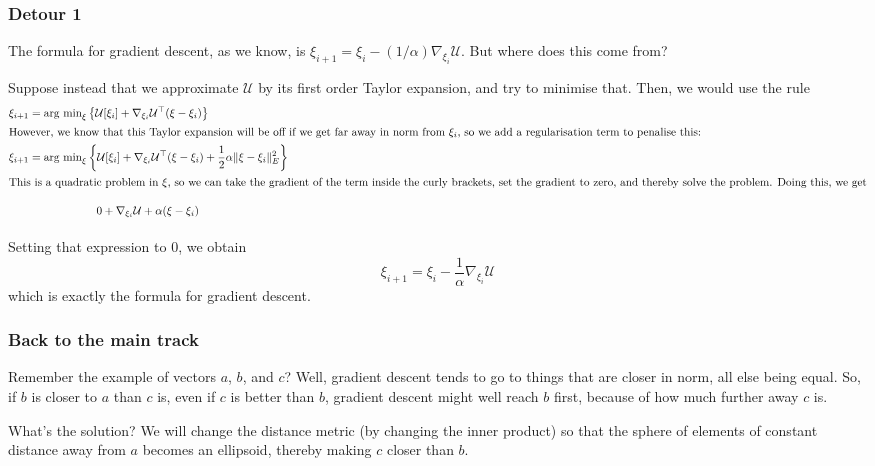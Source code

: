\documentclass[twoside]{article}
\newcommand{\cu}{\mathcal{U}}
\begin{document}
\subsubsection{Detour 1}
\label{sec:detour-1-1}

The formula for gradient descent, as we know, is $\xi_{i+1} = \xi_i - (1/\alpha)\nabla_{\xi_i}\cu$. But where does this come from?

Suppose instead that we approximate $\cu$ by its first order Taylor expansion, and try to minimise that. Then, we would use the rule
\begin{align}
  \label{eq:6}
  \xi_{i+1} &= \text{arg min}_{\xi} \left\{ \cu[\xi_i] + \nabla_{\xi_i}\cu^{\top} (\xi - \xi_i)\right\}\\
  \intertext{However, we know that this Taylor expansion will be off if we get far away in norm from $\xi_i$, so we add a regularisation term to penalise this:}
  \xi_{i+1} &= \text{arg min}_{\xi} \left\{ \cu[\xi_i] + \nabla_{\xi_i}\cu^{\top} (\xi - \xi_i) + \frac{1}{2} \alpha \|\xi - \xi_i \|_E^2 \right\}\label{eq:7} \\
  \intertext{This is a quadratic problem in $\xi$, so we can take the gradient of the term inside the curly brackets, set the gradient to zero, and thereby solve the problem. Doing this, we get}
  &\phantom{= \text{arg min}_\xi \Bigg\{\,\, }0 + \nabla_{\xi_i}\cu + \alpha (\xi - \xi_i)\label{eq:9}
\end{align}
Setting that expression to 0, we obtain
\begin{equation}
  \label{eq:10}
  \xi_{i+1} = \xi_i - \frac{1}{\alpha} \nabla_{\xi_i} \cu
\end{equation}
which is exactly the formula for gradient descent.

\subsubsection{Back to the main track}
\label{sec:back-main-track}

Remember the example of vectors $a$, $b$, and $c$? Well, gradient descent tends to go to things that are closer in norm, all else being equal. So, if $b$ is closer to $a$ than $c$ is, even if $c$ is better than $b$, gradient descent might well reach $b$ first, because of how much further away $c$ is.

What's the solution? We will change the distance metric (by changing the inner product) so that the sphere of elements of constant distance away from $a$ becomes an ellipsoid, thereby making $c$ closer than $b$.
\end{document}
